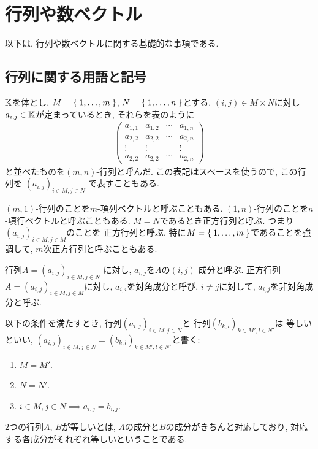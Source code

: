 \section{行列や数ベクトル}
以下は,
行列や数ベクトルに関する基礎的な事項である.

\subsection{行列に関する用語と記号}
$\mathbb{K}$を体とし,
$M=\Set{1,\ldots,m}$,
$N=\Set{1,\ldots,n}$とする.
$(i,j)\in M\times N$に対し$a_{i,j}\in \mathbb{K}$が定まっているとき,
それらを表のように
\begin{align*}
\begin{pmatrix}
a_{1,1} &a_{1,2} & \cdots & a_{1,n}\\
a_{2,2} &a_{2,2} & \cdots & a_{2,n}\\
\vdots &\vdots &   & \vdots\\
a_{2,2} &a_{2,2} & \cdots & a_{2,n}
\end{pmatrix}
\end{align*}
と並べたものを$(m,n)$-行列と呼んだ.
この表記はスペースを使うので,
この行列を
$(a_{i,j})_{i\in M, j\in N}$
で表すこともある.

$(m,1)$-行列のことを$m$-項列ベクトルと呼ぶこともある.
$(1,n)$-行列のことを$n$-項行ベクトルと呼ぶこともある.
$M=N$であるとき正方行列と呼ぶ.
つまり$(a_{i,j})_{i\in M, j\in M}$のことを
正方行列と呼ぶ.
特に$M=\Set{1,\ldots,m}$であることを強調して,
$m$次正方行列と呼ぶこともある.

行列$A=(a_{i,j})_{i\in M, j\in N}$
に対し,
$a_{i,j}$を$A$の$(i,j)$-成分と呼ぶ.
正方行列$A=(a_{i,j})_{i\in M, j\in M}$に対し,
$a_{i,i}$を対角成分と呼び,
$i\neq j$に対して, $a_{i,j}$を非対角成分と呼ぶ.


\begin{definition}
以下の条件を満たすとき,
行列$(a_{i,j})_{i\in M, j\in N}$と
行列$(b_{k,l})_{k\in M', l\in N'}$は
等しいといい,
$(a_{i,j})_{i\in M, j\in N}=(b_{k,l})_{k\in M', l\in N'}$と書く:
\begin{enumerate}
\item $M=M'$.
\item $N=N'$.
\item $i\in M,j\in N\implies a_{i,j}=b_{i,j}$.
\end{enumerate}
\end{definition}

2つの行列$A$, $B$が等しいとは,
$A$の成分と$B$の成分がきちんと対応しており,
対応する各成分がそれぞれ等しいということである.

